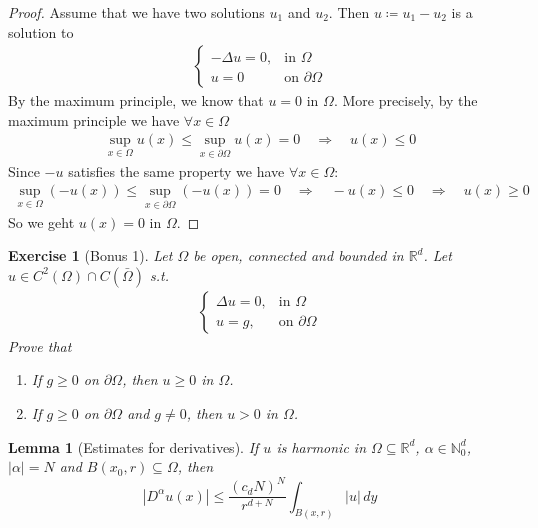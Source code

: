 \documentclass{report}
\theoremstyle{tommy}
\newtheorem{lem}[defn]{Lemma}
\newtheorem{ex}[defn]{Exercise}
\begin{document}
  \begin{proof}
    Assume that we have two solutions \(u_1\) and \(u_2\). Then \(u \coloneqq u_1 - u_2\) is a solution to 
    \begin{align*}
      \begin{cases}
        - \Delta u = 0, &\text{in } \Omega \\
        u = 0 &\text{on } \partial \Omega
      \end{cases}
    \end{align*}
    By the maximum principle, we know that \(u = 0\) in \(\Omega\). More precisely, by the maximum principle we have \(\forall x \in \Omega\)
    \begin{align*}
      \sup_{x \in \Omega} u(x) \le \sup_{x \in \partial \Omega} u(x) = 0
      \quad \Rightarrow \quad
      u(x) \le 0
    \end{align*}
    Since \(-u\) satisfies the same property we have \(\forall x \in \Omega\):
    \begin{align*}
      \sup_{x \in \Omega}(-u(x)) \le \sup_{x \in \partial \Omega} (-u(x)) = 0
      \quad \Rightarrow \quad
      - u(x) \le 0
      \quad \Rightarrow \quad
      u(x) \ge 0
    \end{align*}
    So we geht \(u(x)  = 0\) in \(\Omega\).
  \end{proof}

  \begin{ex}[Bonus 1]\label{bonus-1}
    Let \(\Omega\) be open, connected and bounded in \(\mathbb{R}^d\). Let \(u \in C^2(\Omega) \cap C(\bar \Omega)\) s.t. 
    \begin{align*}
      \begin{cases}
        \Delta u = 0, &\text{in } \Omega \\
        u = g, &\text{on } \partial \Omega
      \end{cases}
    \end{align*}
    Prove that \begin{enumerate}[label=\alph*)]
      \item If \(g \ge 0\) on \(\partial \Omega\), then \(u \ge 0\) in \(\Omega\). 
      \item If \(g \ge 0\) on \(\partial \Omega\) and \(g \ne 0\), then \(u > 0\) in \(\Omega\).
    \end{enumerate}
  \end{ex}

  \begin{lem}[Estimates for derivatives]\label{estimates-of-derivatives}
    If \(u\) is harmonic in \(\Omega \subseteq \mathbb{R}^d\), \(\alpha \in \mathbb{N}_0^d\), \(|\alpha| = N\) and \(B(x_0, r) \subseteq \Omega\), then 
    \[|D^\alpha u(x)| \le \frac{(c_dN)^N}{r^{d+N}} \int_{B(x, r)} |u| \, dy\]
  \end{lem}
\end{document}
